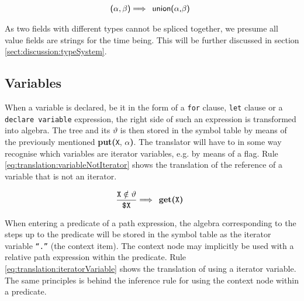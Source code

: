 \begin{equation}
\centering
\textsf{(} \alpha , \beta \textsf{)}
\Longrightarrow
\begin{array}{l}
\mbox{\textsf{union(}} 
\alpha \mbox{\textsf{,}} 
\beta \mbox{\textsf{)}}
\end{array}
\label{eq:translation:sequencing}
\end{equation}




As two fields with different types cannot be spliced together, we presume all
\textsf{value} fields are strings for the time being. This will be further
discussed in section \ref{sect:discussion:typeSystem}.

\subsection{Variables}

\label{sect:translation:mXr:variables}
When a variable is declared, be it in the form of a \texttt{for} clause, \texttt{let} clause or a \texttt{declare
variable} expression, the right side of such an expression is transformed into algebra. The tree and its
$\vartheta$ is then stored in the symbol table by means of the previously mentioned \textbf{put(}\texttt{X},
$\alpha$\textbf{)}. The translator will have to in some way recognise which variables are iterator variables, e.g.
by means of a flag. Rule \ref{eq:translation:variableNotIterator} shows the translation of the reference of a
variable that is not an iterator.

\begin{equation}
\centering
\frac{\displaystyle \texttt{X} \notin \vartheta}{\displaystyle \texttt{\$X}}
\Longrightarrow
\begin{array}{l}
	\mbox{\textbf{get(}\texttt{X}\textbf{)}}
\end{array}
\label{eq:translation:variableNotIterator}
\end{equation}

When entering a predicate of a path expression, the algebra corresponding to the steps up to the predicate will be
stored in the symbol table as the iterator variable \texttt{``.''} (the context item). The context node may
implicitly be used with a relative path expression within the predicate. Rule
\ref{eq:translation:iteratorVariable} shows the translation of using a iterator variable. The same principles is
behind the inference rule for using the context node within a predicate.

